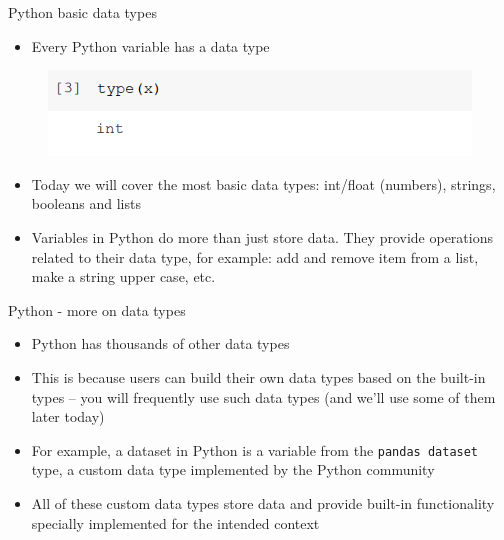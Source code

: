 \documentclass[aspectratio=169]{beamer}
\begin{document}
\begin{frame}{Python basic data types}

	\begin{itemize}
		\item Every Python variable has a data type
	\end{itemize}

	\begin{figure}
		\centering
		\includegraphics[width=0.6\linewidth]{img/data_type.png}
	\end{figure}

	\begin{itemize}
		\item Today we will cover the most basic data types: 
		int/float (numbers), strings, booleans and lists
		\item Variables in Python do more than just store data.
		They provide operations related to their data type, 
		for example: add and remove item from a list, make a string upper case, etc.
	\end{itemize}

\end{frame}

\begin{frame}{Python - more on data types}

	\begin{itemize}
		\item Python has thousands of other data types
		\item This is because users can build their own data types based on the built-in types 
		-- you will frequently use such data types \scriptsize(and we'll use some of them later today) \normalsize
		\item For example, a dataset in Python is a variable from the \texttt{pandas dataset} type, a custom data type implemented by the Python community
		\item All of these custom data types store data 
		and provide built-in functionality specially implemented for the intended context
	\end{itemize}
\end{frame}
\end{document}
